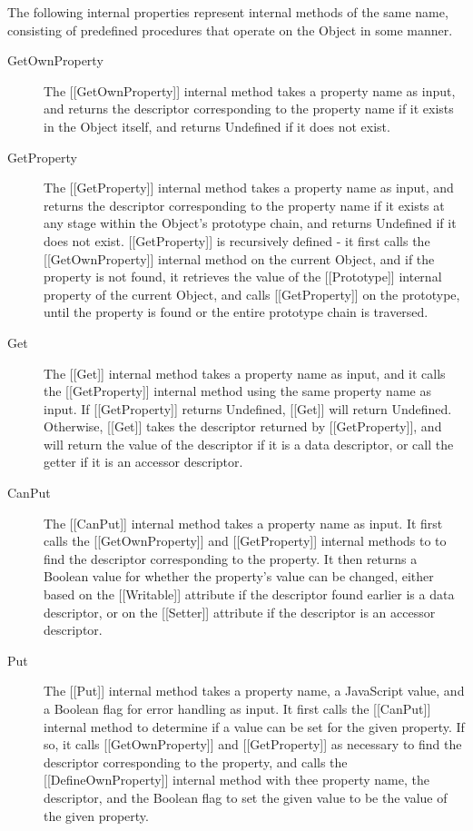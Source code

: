 \documentclass[a4paper,11pt,twoside]{report}
\begin{document}
The following internal properties represent internal methods of the same name, consisting of predefined procedures that operate on the Object in some manner.
\begin{description}
\item[GetOwnProperty] The [[GetOwnProperty]] internal method takes a property name as input, and returns the descriptor corresponding to the property name if it exists in the Object itself, and returns Undefined if it does not exist.

\item[GetProperty] The [[GetProperty]] internal method takes a property name as input, and returns the descriptor corresponding to the property name if it exists at any stage within the Object's prototype chain, and returns Undefined if it does not exist. [[GetProperty]] is recursively defined - it first calls the [[GetOwnProperty]] internal method on the current Object, and if the property is not found, it retrieves the value of the [[Prototype]] internal property of the current Object, and calls [[GetProperty]] on the prototype, until the property is found or the entire prototype chain is traversed.

\item[Get] The [[Get]] internal method takes a property name as input, and it calls the [[GetProperty]] internal method using the same property name as input. If [[GetProperty]] returns Undefined, [[Get]] will return Undefined. Otherwise, [[Get]] takes the descriptor returned by [[GetProperty]], and will return the value of the descriptor if it is a data descriptor, or call the getter if it is an accessor descriptor.

\item[CanPut] The [[CanPut]] internal method takes a property name as input. It first calls the [[GetOwnProperty]] and [[GetProperty]] internal methods to to find the descriptor corresponding to the property. It then returns a Boolean value for whether the property's value can be changed, either based on the [[Writable]] attribute if the descriptor found earlier is a data descriptor, or on the [[Setter]] attribute if the descriptor is an accessor descriptor.

\item[Put] The [[Put]] internal method takes a property name, a JavaScript value, and a Boolean flag for error handling as input. It first calls the [[CanPut]] internal method to determine if a value can be set for the given property. If so, it calls [[GetOwnProperty]] and [[GetProperty]] as necessary to find the descriptor corresponding to the property, and calls the [[DefineOwnProperty]] internal method with thee property name, the descriptor, and the Boolean flag to set the given value to be the value of the given property.


\end{description}
\end{document}
